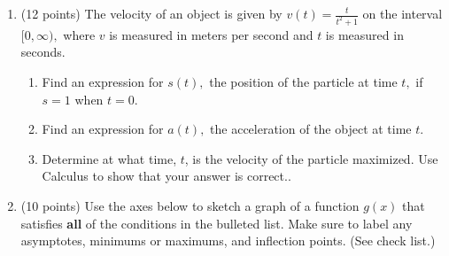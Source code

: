 \documentclass[12pt]{article}
\renewcommand{\emph}[1]{\textsf{\textbf{#1}}}
\begin{document}
\begin{enumerate}
\newpage
\item (12 points) The velocity of an object is given by $\displaystyle v(t)=\frac{t}{t^2+1}$ on the interval $[0,\infty),$ where $v$ is measured in meters per second and $t$ is measured in seconds. \\
	\begin{enumerate}
\item Find an expression for $s(t),$ the position of the particle at time $t,$ if $s=1$ when $t=0.$\vfill
\item Find an expression for $a(t),$ the acceleration of the object at time $t.$
\vspace{1.2in}
\item Determine at what time, $t$, is the velocity of the particle maximized. Use Calculus to show that your answer is correct..\vfill
	\end{enumerate}

\newpage
\item (10 points) Use the axes below to sketch a graph of a function $g(x)$ that satisfies \emph{all} of the conditions in the bulleted list. Make sure to label any asymptotes, minimums or maximums, and inflection points. (See check list.)


\end{enumerate}
\end{document}
